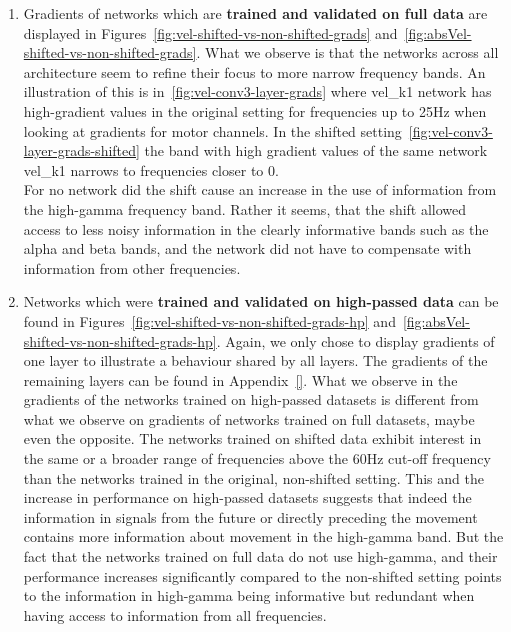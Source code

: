 \begin{enumerate}
    \item Gradients of networks which are \textbf{trained and validated on full data} are displayed in Figures~\ref{fig:vel-shifted-vs-non-shifted-grads} and~\ref{fig:absVel-shifted-vs-non-shifted-grads}.
    What we observe is that the networks across all architecture seem to refine their focus to more narrow frequency bands.
    An illustration of this is in~\ref{fig:vel-conv3-layer-grads} where vel\_k1 network has high-gradient values in the original setting for frequencies up to 25Hz when looking at gradients for motor channels.
    In the shifted setting~\ref{fig:vel-conv3-layer-grads-shifted} the band with high gradient values of the same network vel\_k1 narrows to frequencies closer to 0. \\
    
    For no network  did the shift cause an increase in the use of information from the high-gamma frequency band.
    Rather it seems, that the shift allowed access to less noisy information in the clearly informative bands such as the alpha and beta bands, and the network did not have to compensate with information from other frequencies.
    \item Networks which were \textbf{trained and validated on high-passed data} can be found in Figures~\ref{fig:vel-shifted-vs-non-shifted-grads-hp} and~\ref{fig:absVel-shifted-vs-non-shifted-grads-hp}.
    Again, we only chose to display gradients of one layer to illustrate a behaviour shared by all layers.
    The gradients of the remaining layers can be found in Appendix~\ref{}\todo.
    What we observe in the gradients of the networks trained on high-passed datasets is different from what we observe on gradients of networks trained on full datasets, maybe even the opposite.
    The networks trained on shifted data exhibit interest in the same or a broader range of frequencies above the 60Hz cut-off frequency than the networks trained in the original, non-shifted setting.
    This and the increase in performance on high-passed datasets suggests that indeed the information in signals from the future or directly preceding the movement contains more information about movement in the high-gamma band.
    But the fact that the networks trained on full data do not use high-gamma, and their performance increases significantly compared to the non-shifted setting points to the information in high-gamma being informative but redundant when having access to information from all frequencies.
\end{enumerate}

